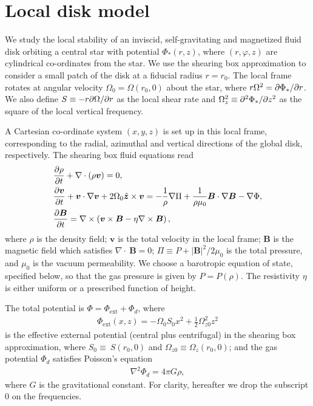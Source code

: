 \section{Local disk model}\label{setup}
We study the local stability of an inviscid, self-gravitating and
magnetized fluid disk orbiting a central star with
potential $\Phi_*(r,z)$, where $(r,\varphi,z)$ are cylindrical
co-ordinates from the star. We use the shearing box approximation     
\citep{goldreich65b} to consider a small patch of the disk at
a fiducial radius $r=r_0$. The local frame rotates at angular velocity 
$\Omega_0=\Omega(r_0,0)$ about the star, where $r\Omega^2 =
\partial\Phi_*/\partial r$. We also define $S\equiv-r\partial\Omega/\partial r$ as the local shear
rate and $\Omega_z^2\equiv\partial^2\Phi_*/\partial z^2$ as the square of the
local vertical frequency. 

A Cartesian co-ordinate system $(x,y,z)$ is set
up in this local frame, corresponding to the radial, azimuthal and vertical
directions of the global disk, respectively. The shearing box fluid
equations read 
\begin{align} 
  &\frac{\partial\rho}{\partial t}+\nabla\cdot(\rho\bm{v}) = 0,\\
  &\frac{\partial \bm{v}}{\partial t} + \bm{v}\cdot\nabla\bm{v} +
  2\Omega_0\hat{\bm{z}}\times\bm{v} = - \frac{1}{\rho}\nabla\Pi +
  \frac{1}{\rho\mu_0}\bm{B}\cdot\nabla\bm{B}
  -\nabla\Phi,\\
  &\frac{\partial\bm{B}}{\partial t}= \nabla\times\left(\bm{v}\times\bm{B} -
  \eta\nabla\times\bm{B}\right), 
\end{align}
where $\rho$ is the density field; $\bm{v}$ is the total velocity in
the local frame; $\bm{B}$ is the magnetic field which satisfies
$\nabla\cdot~\bm{B}=0$; $\Pi \equiv P +
|\bm{B}|^2/2\mu_0$ is the total pressure, and $\mu_0$ is the vacuum
permeability. We choose a barotropic equation of state, specified
below, so that the gas pressure is given by $P=P(\rho)$. The
resistivity $\eta$ is either uniform or a prescribed function of
height. 


The total potential is $\Phi = \Phi_\mathrm{ext} + \Phi_d$, where
\begin{align}
  \Phi_\mathrm{ext}(x,z) = -\Omega_0 S_0 x^2 +
  \frac{1}{2}\Omega_{z0}^2z^2 
\end{align}
is the effective external potential (central plus centrifugal) in the
shearing box approximation, where $S_0\equiv ~S(r_0,0)$ and
$\Omega_{z0}\equiv\Omega_z(r_0,0)$; 
and the gas potential $\Phi_d$ satisfies Poisson's equation
\begin{align}
  \nabla^2\Phi_d = 4\pi G \rho, 
\end{align}
where $G$ is the gravitational constant. For clarity, hereafter we
drop the subscript $0$ on the frequencies. 




